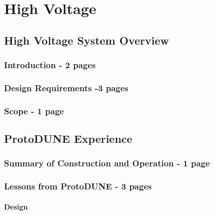 \chapter{High Voltage}
\label{ch:dp-hv}

\section{High Voltage System Overview}
\label{sec:fddp-hv-ov}

\subsection{Introduction - 2 pages}
\label{sec:fddp-hv-intro}

\subsection{Design Requirements -3 pages}
\label{sec:fddp-hv-des-consid}

\subsection{Scope - 1 page }
\label{sec:fddp-hv-scope}


\clearpage
\section{ProtoDUNE Experience}
\label{sec:fddp-hv-protodune}
\subsection{Summary of Construction and Operation - 1 page }
\label{sec:fddp-hv-protodune-summary}

\subsection{Lessons from ProtoDUNE - 3 pages}
\label{sec:fddp-hv-protodune-lessons}

\subsubsection{Design}
\label{sec:fddp-hv-protodune-lessons-design}
